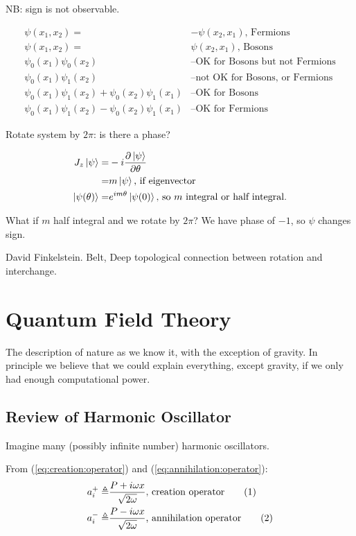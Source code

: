 \documentclass[]{article}
\newcommand\numberthis{\addtocounter{equation}{1}\tag{\theequation}}
\begin{document}
NB: sign is not observable.

\begin{align*}
\psi(x_1,x_2)=&-\psi(x_2,x_1) \text{, Fermions}\\
\psi(x_1,x_2)=&\psi(x_2,x_1) \text{, Bosons}\\
\psi_0(x_1)\psi_0(x_2)& \text{--OK for Bosons but not Fermions}\\
\psi_0(x_1)\psi_1(x_2)& \text{--not OK for Bosons, or Fermions}\\
\psi_0(x_1)\psi_1(x_2)+\psi_0(x_2)\psi_1(x_1)& \text{--OK for Bosons}\\
\psi_0(x_1)\psi_1(x_2)-\psi_0(x_2)\psi_1(x_1)& \text{--OK for Fermions}
\end{align*}

Rotate system by $2\pi$: is there a phase?

\begin{align*}
J_z\ket{\psi} =& -i \frac{\partial \ket{\psi}}{\partial \theta}\\
=& m\ket{\psi} \text{, if eigenvector}\\
\ket{\psi(\theta)} =& e^{im\theta}\ket{\psi(0)}\text{, so $m$ integral or half integral.}
\end{align*}

What if $m$ half integral and we rotate by $2\pi$? We have phase of $-1$, so $\psi$ changes sign.

David Finkelstein. Belt, Deep topological connection between rotation and interchange.

\section{Quantum Field Theory}

The description of nature as we know it, with the exception of gravity. In principle we believe that we could explain everything, except gravity, if we only had enough computational power.

\subsection{Review of Harmonic Oscillator}
Imagine many (possibly infinite number) harmonic oscillators.

From (\ref{eq:creation:operator}) and (\ref{eq:annihilation:operator}):
\begin{align*}
a^+_i \triangleq & \frac{P + i \omega x } {\sqrt{2 \omega}} \text{, creation operator} \numberthis \label{eq:creation:operator:i}\\
a^-_i \triangleq & \frac{P - i \omega x } {\sqrt{2 \omega}}\text{, annihilation operator} \numberthis \label{eq:annihilation:operator_i}\\
\end{align*}
\end{document}
